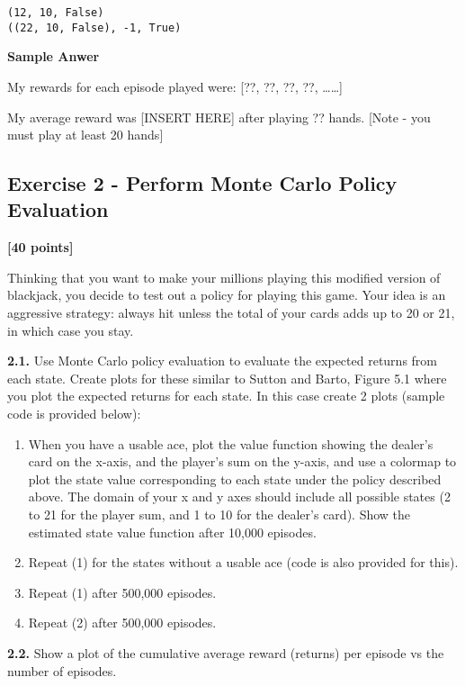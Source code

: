 \documentclass[
  letterpaper,
  DIV=11,
  numbers=noendperiod]{scrartcl}
\providecommand{\tightlist}{%
  \setlength{\itemsep}{0pt}\setlength{\parskip}{0pt}}\usepackage{longtable,booktabs,array}
\begin{document}
\begin{verbatim}
(12, 10, False)
((22, 10, False), -1, True)
\end{verbatim}

\textbf{Sample Anwer}

My rewards for each episode played were: {[}??, ??, ??, ??,
\ldots\ldots{]}

My average reward was {[}INSERT HERE{]} after playing ?? hands. {[}Note
- you must play at least 20 hands{]}

\subsection{Exercise 2 - Perform Monte Carlo Policy
Evaluation}\label{exercise-2---perform-monte-carlo-policy-evaluation}

\textbf{{[}40 points{]}}

Thinking that you want to make your millions playing this modified
version of blackjack, you decide to test out a policy for playing this
game. Your idea is an aggressive strategy: always hit unless the total
of your cards adds up to 20 or 21, in which case you stay.

\textbf{2.1.} Use Monte Carlo policy evaluation to evaluate the expected
returns from each state. Create plots for these similar to Sutton and
Barto, Figure 5.1 where you plot the expected returns for each state. In
this case create 2 plots (sample code is provided below):

\begin{enumerate}
\def\labelenumi{\arabic{enumi}.}
\tightlist
\item
  When you have a usable ace, plot the value function showing the
  dealer's card on the x-axis, and the player's sum on the y-axis, and
  use a colormap to plot the state value corresponding to each state
  under the policy described above. The domain of your x and y axes
  should include all possible states (2 to 21 for the player sum, and 1
  to 10 for the dealer's card). Show the estimated state value function
  after 10,000 episodes.
\item
  Repeat (1) for the states without a usable ace (code is also provided
  for this).
\item
  Repeat (1) after 500,000 episodes.
\item
  Repeat (2) after 500,000 episodes.
\end{enumerate}

\textbf{2.2.} Show a plot of the cumulative average reward (returns) per
episode vs the number of episodes.
\end{document}

